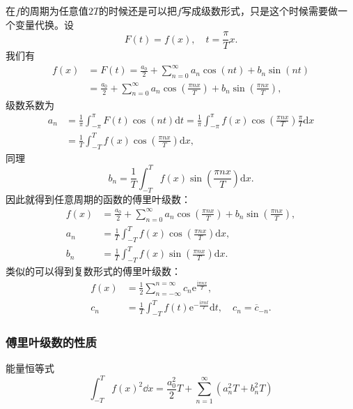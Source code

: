 \documentclass[UTF8]{ctexart}
\newcommand*{\ee}{\mathrm{e}}
\begin{document}
在$f$的周期为任意值$2T$的时候还是可以把$f$写成级数形式，只是这个时候需要做一个变量代换。设
\[
F(t) = f(x), \quad t = \frac{\pi}{T} x.
\] 
我们有 
\[
\begin{aligned}
    f(x) &= F(t) = \frac{a_0}{2} + \sum_{n=0}^{\infty} a_n \cos (nt) + b_n \sin(nt) \\
    &= \frac{a_0}{2} + \sum_{n=0}^{\infty} a_n \cos \left(\frac{\pi n x}{T}\right) + b_n \sin \left(\frac{\pi n x}{T}\right),
\end{aligned}
\]
级数系数为
\[
\begin{aligned}
    a_n &= \frac{1}{\pi} \int_{-\pi}^\pi F(t) \cos(nt) \mathrm{d}t = \frac{1}{\pi} \int_{-\pi}^\pi f(x) \cos \left(\frac{\pi n x}{T} \right) \frac{\pi}{T} \mathrm{d}x \\
    &= \frac{1}{T} \int_{-T}^T f(x) \cos \left(\frac{\pi n x}{T} \right) \mathrm{d}x,
\end{aligned}
\]
同理
\[
b_n = \frac{1}{T} \int_{-T}^T f(x) \sin \left(\frac{\pi n x}{T} \right) \mathrm{d}x.
\]
因此就得到任意周期的函数的傅里叶级数：
\begin{equation}
    \begin{aligned}
        f(x) &= \frac{a_0}{2} + \sum_{n=0}^{\infty} a_n \cos \left(\frac{\pi n x}{T}\right) + b_n \sin \left(\frac{\pi n x}{T}\right), \\
        a_n &= \frac{1}{T} \int_{-T}^T f(x) \cos \left(\frac{\pi n x}{T} \right) \mathrm{d}x, \\
        b_n &= \frac{1}{T} \int_{-T}^T f(x) \sin \left(\frac{\pi n x}{T} \right) \mathrm{d}x.
    \end{aligned}
    \label{eq:fourier-series-real}
\end{equation}
类似的可以得到复数形式的傅里叶级数：
\begin{equation}
    \begin{aligned}
        f(x) &= \frac{1}{2} \sum_{n = -\infty}^{n = \infty} c_n \ee^{\frac{\mathrm{i}\pi n x}{T}}, \\
        c_n &= \frac{1}{T}\int_{-T}^{T} f(t) \ee^{-\frac{\mathrm{i}\pi n t}{T}} \mathrm{d}t, \quad c_n = \overline{c}_{-n}.
    \end{aligned}
    \label{eq:fourier-series-complex}
\end{equation}

\subsubsection{傅里叶级数的性质}

能量恒等式
\[
    \int_{-T}^T f(x)^2 \dd x = \frac{a_0^2}{2} T + \sum_{n=1}^\infty \left( a_n^2 T + b_n^2 T \right)
\]
\end{document}
